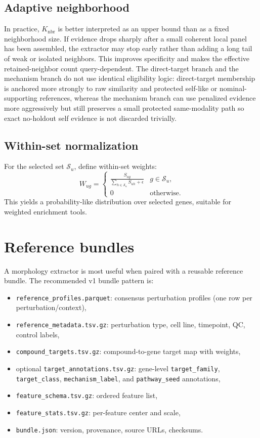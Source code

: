 \documentclass[11pt]{article}
\begin{document}
\subsection{Adaptive neighborhood}
In practice, $K_{\mathrm{nbr}}$ is better interpreted as an upper bound than as a fixed neighborhood size. If evidence drops sharply after a small coherent local panel has been assembled, the extractor may stop early rather than adding a long tail of weak or isolated neighbors. This improves specificity and makes the effective retained-neighbor count query-dependent. The direct-target branch and the mechanism branch do not use identical eligibility logic: direct-target membership is anchored more strongly to raw similarity and protected self-like or nominal-supporting references, whereas the mechanism branch can use penalized evidence more aggressively but still preserves a small protected same-modality path so exact no-holdout self evidence is not discarded trivially.

\subsection{Within-set normalization}
For the selected set $\mathcal{S}_u$, define within-set weights:
\[
W_{ug} =
\begin{cases}
\displaystyle \frac{S_{ug}}{\sum_{h \in \mathcal{S}_u} S_{uh} + \epsilon} & g \in \mathcal{S}_u, \\
0 & \text{otherwise.}
\end{cases}
\]
This yields a probability-like distribution over selected genes, suitable for weighted enrichment tools.

\section{Reference bundles}
A morphology extractor is most useful when paired with a reusable reference bundle. The recommended v1 bundle pattern is:
\begin{itemize}[leftmargin=2em]
\item \texttt{reference\_profiles.parquet}: consensus perturbation profiles (one row per perturbation/context),
\item \texttt{reference\_metadata.tsv.gz}: perturbation type, cell line, timepoint, QC, control labels,
\item \texttt{compound\_targets.tsv.gz}: compound-to-gene target map with weights,
\item optional \texttt{target\_annotations.tsv.gz}: gene-level \texttt{target\_family}, \texttt{target\_class}, \texttt{mechanism\_label}, and \texttt{pathway\_seed} annotations,
\item \texttt{feature\_schema.tsv.gz}: ordered feature list,
\item \texttt{feature\_stats.tsv.gz}: per-feature center and scale,
\item \texttt{bundle.json}: version, provenance, source URLs, checksums.
\end{itemize}
\end{document}
